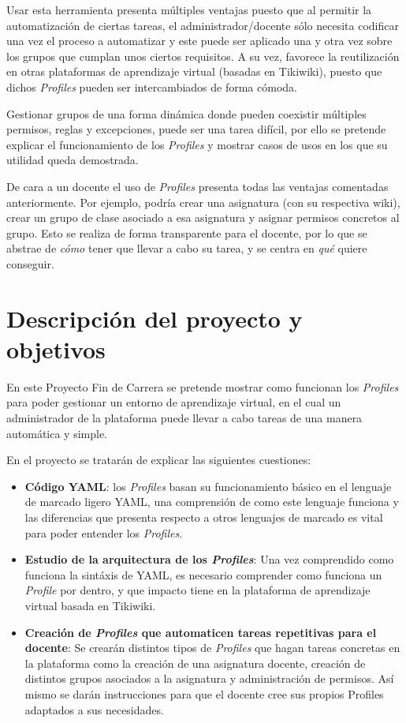 \documentclass[12pt,oneside,a4paper]{article}
\begin{document}
Usar esta herramienta presenta múltiples ventajas puesto que al permitir la automatización de ciertas tareas, el administrador/docente sólo necesita codificar una vez el proceso a automatizar y este puede ser aplicado una y otra vez sobre los grupos que cumplan unos ciertos requisitos. A su vez, favorece la reutilización en otras plataformas de aprendizaje virtual (basadas en Tikiwiki), puesto que dichos \textit{Profiles} pueden ser intercambiados de forma cómoda.

Gestionar grupos de una forma dinámica donde pueden coexistir múltiples permisos, reglas y excepciones, puede ser una tarea difícil, por ello se pretende explicar el funcionamiento de los \textit{Profiles} y mostrar casos de usos en los que su utilidad queda demostrada.

De cara a un docente el uso de \textit{Profiles} presenta todas las ventajas comentadas anteriormente. Por ejemplo, podría crear una asignatura (con su respectiva wiki), crear un grupo de clase asociado a esa asignatura y asignar permisos concretos al grupo. Esto se realiza de forma transparente para el docente, por lo que se abstrae de \textit{cómo} tener que llevar a cabo su tarea, y se centra en \textit{qué} quiere conseguir.

\section{Descripción del proyecto y objetivos}

En este Proyecto Fin de Carrera se pretende mostrar como funcionan los \textit{Profiles} para poder gestionar un entorno de aprendizaje virtual, en el cual un administrador de la plataforma puede llevar a cabo tareas de una manera automática y simple.

En el proyecto se tratarán de explicar las siguientes cuestiones:

\begin{itemize}
    
    \item \textbf{Código YAML\cite{YAML}}: los \textit{Profiles} basan su funcionamiento básico en el lenguaje de marcado ligero YAML, una comprensión de como este lenguaje funciona y las diferencias que presenta respecto a otros lenguajes de marcado es vital para poder entender los \textit{Profiles}.

    \item \textbf{Estudio de la arquitectura de los \textit{Profiles}}: Una vez comprendido como funciona la sintáxis de YAML, es necesario comprender como funciona un \textit{Profile} por dentro, y que impacto tiene en la plataforma de aprendizaje virtual basada en Tikiwiki.

    \item \textbf{Creación de \textit{Profiles} que automaticen tareas repetitivas para el docente}: Se crearán distintos tipos de \textit{Profiles} que hagan tareas concretas en la plataforma como la creación de una asignatura docente, creación de distintos grupos asociados a la asignatura y administración de permisos. Así mismo se darán instrucciones para que el docente cree sus propios Profiles adaptados a sus necesidades.

\end {itemize}
\end{document}
